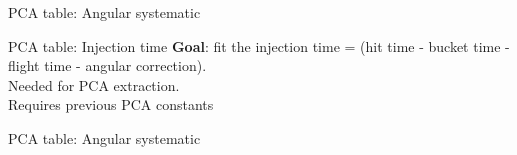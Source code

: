 \documentclass[xcolor=table]{beamer}
\begin{document}
\begin{frame}{PCA table: Angular systematic} 
\noindent{}
\end{frame}

\begin{frame}{PCA table: Injection time}
\textbf{Goal}: fit the injection time = \newline (hit time - bucket time - flight time - angular correction).\\Needed for PCA extraction.\\
Requires previous PCA constants
\end{frame}

\begin{frame}{PCA table: Angular systematic} 
\noindent{}
\end{frame}
\end{document}
